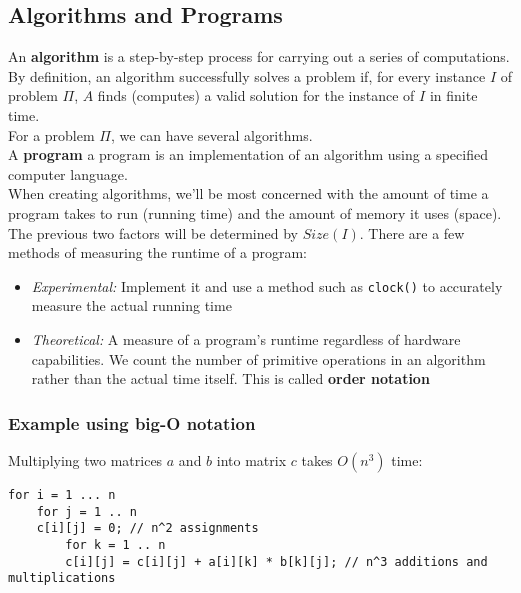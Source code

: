 \documentclass{report}
\begin{document}
\subsection{Algorithms and Programs}
An \textbf{algorithm} is a step-by-step process for carrying out a series of computations. By definition, an algorithm successfully solves a problem if, for every instance $I$ of problem $\Pi$, $A$ finds (computes) a valid solution for the instance of $I$ in finite time. \\
For a problem $\Pi$, we can have several algorithms. \\
A \textbf{program} a program is an implementation of an algorithm using a specified computer language. \\
When creating algorithms, we'll be most concerned with the amount of time a program takes to run (running time) and the amount of memory it uses (space). The previous two factors will be determined by $Size(I)$.
There are a few methods of measuring the runtime of a program:
\begin{itemize}
\item \textit{Experimental:} Implement it and use a method such as \texttt{clock()} to accurately measure the actual running time
\item \textit{Theoretical:} A measure of a program's runtime regardless of hardware capabilities. We count the number of primitive operations in an algorithm rather than the actual time itself. This is called \textbf{order notation}
\end{itemize}
\newpage
\subsubsection{Example using big-O notation}
Multiplying two matrices $a$ and $b$ into matrix $c$ takes $O(n^3)$ time:
\begin{lstlisting}
for i = 1 ... n
	for j = 1 .. n
	c[i][j] = 0; // n^2 assignments
		for k = 1 .. n
		c[i][j] = c[i][j] + a[i][k] * b[k][j]; // n^3 additions and multiplications
\end{lstlisting}
\end{document}
